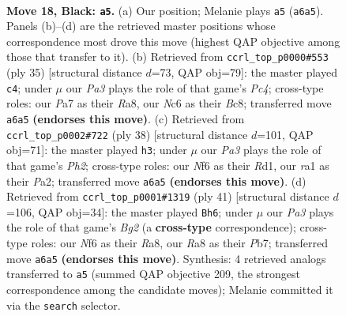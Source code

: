 \documentclass[11pt]{article}
\begin{document}
\clearpage

\begin{figure}[p]\centering
\begin{subfigure}{0.46\textwidth}\centering
\resizebox{\linewidth}{!}{%
\newchessgame
\chessboard[
  setfen={r1b1r1k1/p1p2pp1/p1n2n1p/2q4P/2P2P2/2P1P3/8/R1BQKBNR b KQ - 1 18},
  showmover=false,
  pgfstyle=straightmove, color=movearrow, markmove={a6-a5}
]}
\caption{}
\end{subfigure}\hfill
\begin{subfigure}{0.46\textwidth}\centering
\resizebox{\linewidth}{!}{%
\newchessgame
\chessboard[
  setfen={r1b1k2r/pp3p2/1n1p3p/q1pPp2n/P6B/2P1PP2/2Q1N3/R3KB1R b KQkq - 0 18},
  showmover=false,
  pgfstyle=straightmove, color=movearrow, markmove={c5-c4}
]}
\caption{}
\end{subfigure}
\\[4pt]
\begin{subfigure}{0.46\textwidth}\centering
\resizebox{\linewidth}{!}{%
\newchessgame
\chessboard[
  setfen={4kb1r/2qb1pp1/p3p3/1rp3Q1/7p/1N2N3/PPR2PPP/3R2K1 w k - 0 20},
  showmover=false,
  pgfstyle=straightmove, color=movearrow, markmove={h2-h3}
]}
\caption{}
\end{subfigure}\hfill
\begin{subfigure}{0.46\textwidth}\centering
\resizebox{\linewidth}{!}{%
\newchessgame
\chessboard[
  setfen={r1r3k1/1p3pbp/3p2p1/qp2nP2/3B1R2/2P5/P3B1PP/R2Q3K b - - 3 21},
  showmover=false,
  pgfstyle=straightmove, color=movearrow, markmove={g7-h6}
]}
\caption{}
\end{subfigure}
\caption{\textbf{Move 18, Black: \texttt{a5}.} (a) Our position; Melanie plays \texttt{a5} (\texttt{a6a5}). Panels (b)--(d) are the retrieved master positions whose correspondence most drove this move (highest QAP objective among those that transfer to it). (b) Retrieved from \texttt{ccrl\_top\_p0000\#553} (ply 35) [structural distance $d$=73, QAP obj=79]: the master played \texttt{c4}; under $\mu$ our \emph{Pa3} plays the role of that game's \emph{Pc4}; cross-type roles: our \emph{P}a7 as their \emph{R}a8, our \emph{N}c6 as their \emph{B}c8; transferred move \texttt{a6a5} \textbf{(endorses this move)}. (c) Retrieved from \texttt{ccrl\_top\_p0002\#722} (ply 38) [structural distance $d$=101, QAP obj=71]: the master played \texttt{h3}; under $\mu$ our \emph{Pa3} plays the role of that game's \emph{Ph2}; cross-type roles: our \emph{N}f6 as their \emph{R}d1, our \emph{r}a1 as their \emph{P}a2; transferred move \texttt{a6a5} \textbf{(endorses this move)}. (d) Retrieved from \texttt{ccrl\_top\_p0001\#1319} (ply 41) [structural distance $d$=106, QAP obj=34]: the master played \texttt{Bh6}; under $\mu$ our \emph{Pa3} plays the role of that game's \emph{Bg2} (a \textbf{cross-type} correspondence); cross-type roles: our \emph{N}f6 as their \emph{R}a8, our \emph{R}a8 as their \emph{P}b7; transferred move \texttt{a6a5} \textbf{(endorses this move)}. Synthesis: 4 retrieved analogs transferred to \texttt{a5} (summed QAP objective 209, the strongest correspondence among the candidate moves); Melanie committed it via the \texttt{search} selector.}
\label{fig:thought-m35}
\end{figure}
\end{document}
